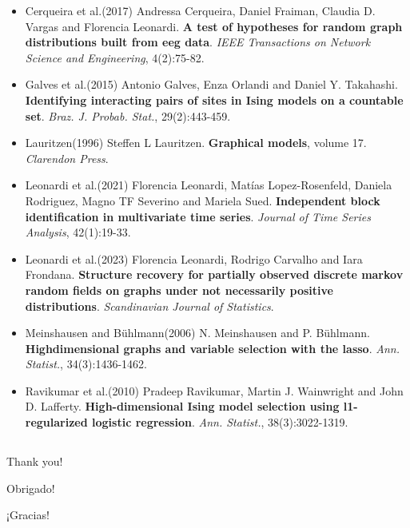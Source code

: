 \documentclass[
  english,
  letterpaper,
  DIV=11,
  numbers=noendperiod]{scrartcl}
\begin{document}
\begin{itemize}
\item
  Cerqueira et al.(2017) Andressa Cerqueira, Daniel Fraiman, Claudia D.
  Vargas and Florencia Leonardi. \textbf{A test of hypotheses for random
  graph distributions built from eeg data}. \emph{IEEE Transactions on
  Network Science and Engineering}, 4(2):75-82.
\item
  Galves et al.(2015) Antonio Galves, Enza Orlandi and Daniel Y.
  Takahashi. \textbf{Identifying interacting pairs of sites in Ising
  models on a countable set}. \emph{Braz. J. Probab. Stat.},
  29(2):443-459.
\item
  Lauritzen(1996) Steffen L Lauritzen. \textbf{Graphical models}, volume
  17. \emph{Clarendon Press}.
\item
  Leonardi et al.(2021) Florencia Leonardi, Matías Lopez-Rosenfeld,
  Daniela Rodriguez, Magno TF Severino and Mariela Sued.
  \textbf{Independent block identification in multivariate time series}.
  \emph{Journal of Time Series Analysis}, 42(1):19-33.
\item
  Leonardi et al.(2023) Florencia Leonardi, Rodrigo Carvalho and Iara
  Frondana. \textbf{Structure recovery for partially observed discrete
  markov random fields on graphs under not necessarily positive
  distributions}. \emph{Scandinavian Journal of Statistics}.
\item
  Meinshausen and Bühlmann(2006) N. Meinshausen and P. Bühlmann.
  \textbf{Highdimensional graphs and variable selection with the lasso}.
  \emph{Ann. Statist.}, 34(3):1436-1462.
\item
  Ravikumar et al.(2010) Pradeep Ravikumar, Martin J. Wainwright and
  John D. Lafferty. \textbf{High-dimensional Ising model selection using
  l1-regularized logistic regression}. \emph{Ann. Statist.},
  38(3):3022-1319.
\end{itemize}

\subsection{}\label{section}

Thank you!

Obrigado!

¡Gracias!
\end{document}
